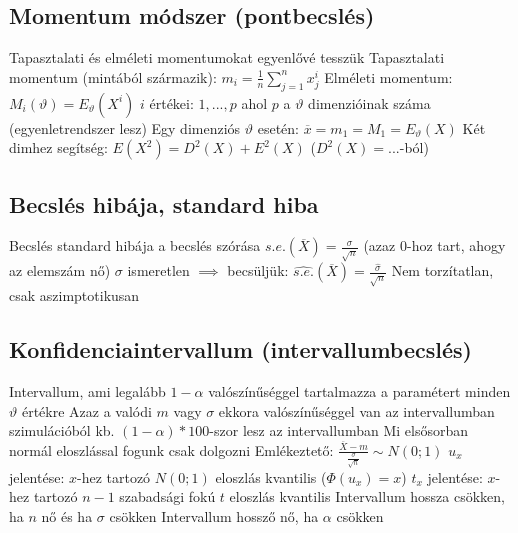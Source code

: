 \documentclass[12pt,a4paper]{article}
\begin{document}
\subsection{Momentum módszer (pontbecslés)}

\begin{outline}
	\1 Tapasztalati és elméleti momentumokat egyenlővé tesszük
		\2 Tapasztalati momentum (mintából származik): $m_i = \frac{1}{n} \sum_{j=1}^{n} x_j^i$
		\2 Elméleti momentum: $M_i(\vartheta) = E_\vartheta(X^i)$
	\1 $i$ értékei: $1,...,p$ ahol $p$ a $\vartheta$ dimenzióinak száma (egyenletrendszer lesz)
		\2 Egy dimenziós $\vartheta$ esetén: $\overline{x} = m_1 = M_1 = E_\vartheta(X)$
		\2 Két dimhez segítség: $E(X^2) = D^2(X) + E^2(X)$ \; ($D^2(X)=...$-ból)
\end{outline}

\subsection{Becslés hibája, standard hiba}

\begin{outline}
	\1 Becslés standard hibája a becslés szórása
	\1 $s.e.(\overline{X}) = \frac{\sigma}{\sqrt{n}}$ \;\; (azaz 0-hoz tart, ahogy az elemszám nő)
	\1 $\sigma$ ismeretlen $\implies$ becsüljük:
	$\widehat{s.e.}(\overline{X}) = \frac{\widehat{\sigma}}{\sqrt{n}}$
		\2 Nem torzítatlan, csak aszimptotikusan
\end{outline}

\pagebreak

\subsection{Konfidenciaintervallum (intervallumbecslés)}

\begin{outline}
	\1 Intervallum, ami legalább $1 - \alpha$ valószínűséggel tartalmazza a paramétert minden $\vartheta$ értékre
		\2 Azaz a valódi $m$ vagy $\sigma$ ekkora valószínűséggel van az intervallumban
		 szimulációból kb. $(1-\alpha)*100$-szor lesz az intervallumban
	\1 Mi elsősorban normál eloszlással fogunk csak dolgozni
	\1 Emlékeztető: $\frac{\overline{X}-m}{\frac{\sigma}{\sqrt{n}}} \sim N(0;1)$
	\1 $u_x$ jelentése: $x$-hez tartozó $N(0;1)$ eloszlás kvantilis ($\Phi(u_x) = x$)
	\1 $t_x$ jelentése: $x$-hez tartozó $n-1$ szabadsági fokú $t$ eloszlás kvantilis
	\1 Intervallum hossza csökken, ha $n$ nő és ha $\sigma$ csökken
	\1 Intervallum hossző nő, ha $\alpha$ csökken
\end{outline}
\end{document}
